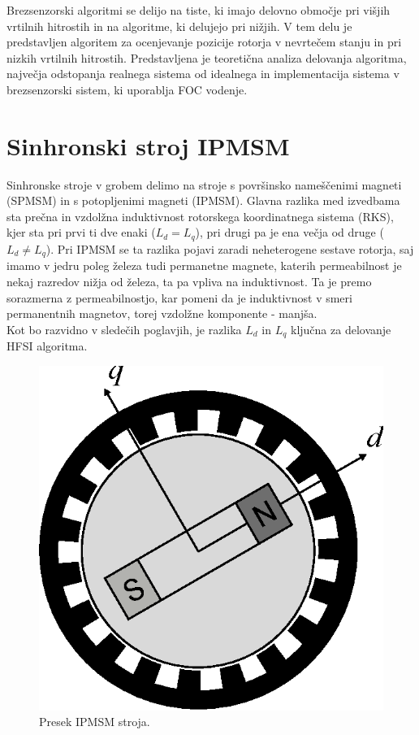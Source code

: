 \documentclass[a4paper,twoside,openright,12pt,slovene]{book}
\begin{document}
Brezsenzorski algoritmi se delijo na tiste, ki imajo delovno območje pri višjih vrtilnih hitrostih in na algoritme, ki delujejo pri nižjih. V tem delu je predstavljen algoritem za ocenjevanje pozicije
rotorja v nevrtečem stanju in pri nizkih vrtilnih hitrostih. Predstavljena je teoretična analiza delovanja algoritma, največja odstopanja realnega sistema od idealnega in implementacija sistema
v brezsenzorski sistem, ki uporablja FOC vodenje.


\chapter{Sinhronski stroj IPMSM} \label{sinhronskiStroj}

Sinhronske stroje v grobem delimo na stroje s površinsko nameščenimi magneti (SPMSM) in s potopljenimi magneti (IPMSM). Glavna razlika med izvedbama sta prečna in vzdolžna induktivnost rotorskega
koordinatnega sistema (RKS), kjer sta pri prvi ti dve enaki ($L_d = L_q$), pri drugi pa je ena večja od druge ($L_d \neq L_q$). Pri IPMSM se ta razlika pojavi zaradi neheterogene sestave rotorja, saj
imamo v jedru poleg železa tudi permanetne magnete, katerih permeabilnost je nekaj razredov nižja od železa, ta pa vpliva na induktivnost. Ta je premo sorazmerna z permeabilnostjo, kar pomeni da je
induktivnost v smeri permanentnih magnetov, torej vzdolžne komponente - manjša. 
\\
Kot bo razvidno v sledečih poglavjih, je razlika $L_d$ in $L_q$ ključna za delovanje HFSI algoritma. 

\begin{figure}[!htbp]
    \centering
    \includegraphics[width=0.5\columnwidth]{Slike/Inkscape/IPMSMsimple.eps}
    \caption{\label{IPMSM} Presek IPMSM stroja.}
\end{figure}
\end{document}
